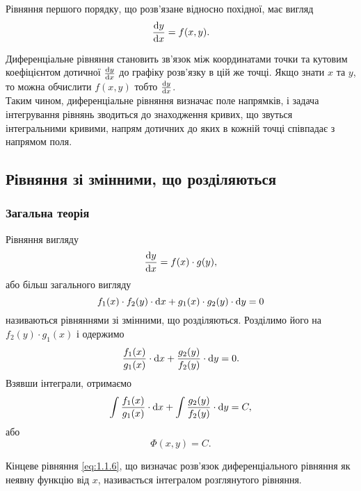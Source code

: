 Рівняння першого порядку, що розв’язане відносно похідної, має вигляд
\begin{equation}
	\label{eq:1.1.1}
	\frac{\mathop{}\!\mathrm{d} y}{\mathop{}\!\mathrm{d} x} = f(x, y).	
\end{equation}

Диференціальне рівняння становить зв’язок між координатами точки та кутовим коефіцієнтом дотичної $\frac{\mathop{}\!\mathrm{d} y}{\mathop{}\!\mathrm{d} x}$ до графіку розв’язку в цій же точці. Якщо знати $x$ та $y$, то можна обчислити $f(x, y)$ тобто $\frac{\mathop{}\!\mathrm{d} y}{\mathop{}\!\mathrm{d} x}$. \\

Таким чином, диференціальне рівняння визначає поле напрямків, і задача інтегрування рівнянь зводиться до знаходження кривих, що звуться інтегральними кривими, напрям дотичних до яких в кожній точці співпадає з напрямом поля.

\subsection{Рівняння зі змінними, що розділяються}

\subsubsection{Загальна теорія}

Рівняння вигляду
\begin{equation}
	\label{eq:1.1.2}
	\frac{\mathop{}\!\mathrm{d} y}{\mathop{}\!\mathrm{d} x} = f(x) \cdot g(y),
\end{equation}
або більш загального вигляду
\begin{equation}
	\label{eq:1.1.3}
	f_1(x) \cdot f_2(y) \cdot \mathop{}\!\mathrm{d} x + g_1(x) \cdot g_2(y) \cdot \mathop{}\!\mathrm{d} y = 0
\end{equation}
називаються рівняннями зі змінними, що розділяються. Розділимо його на $f_2(y) \cdot g_1(x)$ і одержимо
\begin{equation}
	\label{eq:1.1.4}
	\frac{f_1(x)}{g_1(x)} \cdot \mathop{}\!\mathrm{d} x + \frac{g_2(y)}{f_2(y)} \cdot \mathop{}\!\mathrm{d} y = 0.
\end{equation}
Взявши інтеграли, отримаємо
\begin{equation}
	\label{eq:1.1.5}
	\int \frac{f_1(x)}{g_1(x)} \cdot \mathop{}\!\mathrm{d} x + \int \frac{g_2(y)}{f_2(y)} \cdot \mathop{}\!\mathrm{d} y = C,
\end{equation}
або 
\begin{equation}
	\label{eq:1.1.6}
	\Phi(x, y) = C.
\end{equation}

\begin{definition}
	Кінцеве рівняння \eqref{eq:1.1.6}, що визначає розв’язок диференціального рівняння як неявну функцію від $x$, називається інтегралом розглянутого рівняння.
\end{definition}

